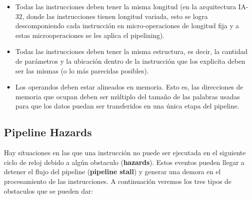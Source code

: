 \begin{itemize}
	\item Todas las instrucciones deben tener la misma longitud (en la arquitectura IA-32, donde las instrucciones tienen longitud variada, esto se logra descomponiendo cada instrucción en micro-operaciones de longitud fija y a estas microoperaciones se les aplica el pipelining).
	\item Todas las instrucciones deben tener la misma estructura, es decir, la cantidad de parámetros y la ubicación dentro de la instrucción que los explicita deben ser las mismas (o lo más parecidas posibles). 
	\item Los operandos deben estar alineados en memoria. Esto es, las direcciones de memoria que ocupan deben ser múltiplo del tamaño de las palabras usadas para que los datos puedan ser transferidos en una única etapa del pipeline.
\end{itemize}

\subsection{Pipeline Hazards}
Hay situaciones en las que una instrucción no puede ser ejecutada en el siguiente ciclo de reloj debido a algún obstaculo (\textbf{hazards}). Estos eventos pueden llegar a detener el flujo del pipeline (\textbf{pipeline stall}) y generar una demora en el procesamiento de las instrucciones. A continuación veremos los tres tipos de obstaculos que se pueden dar:


